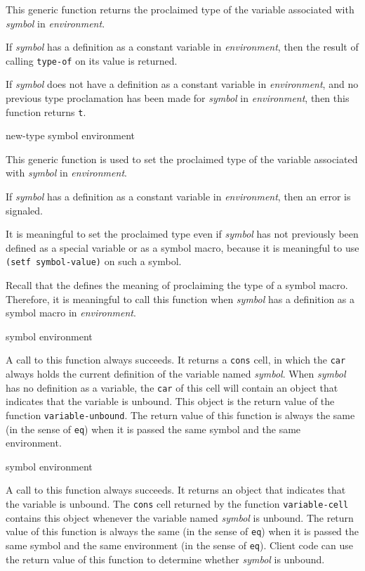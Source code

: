 This generic function returns the proclaimed type of the variable
associated with \textit{symbol} in \textit{environment}.

If \textit{symbol} has a definition as a constant variable in
\textit{environment}, then the result of calling \texttt{type-of} on
its value is returned.

If \textit{symbol} does not have a definition as a constant variable
in \textit{environment}, and no previous type proclamation has been
made for \textit{symbol} in \textit{environment}, then this function
returns \texttt{t}.

 {new-type symbol environment}

This generic function is used to set the proclaimed type of the
variable associated with \textit{symbol} in \textit{environment}.

If \textit{symbol} has a definition as a constant variable in
\textit{environment}, then an error is signaled.

It is meaningful to set the proclaimed type even if \textit{symbol}
has not previously been defined as a special variable or as a symbol
macro, because it is meaningful to use \texttt{(setf symbol-value)} on
such a symbol.

Recall that the \hs{} defines the meaning of proclaiming the type of a
symbol macro.  Therefore, it is meaningful to call this function when
\textit{symbol} has a definition as a symbol macro in
\textit{environment}.

 {symbol environment}

A call to this function always succeeds.  It returns a \texttt{cons}
cell, in which the \texttt{car} always holds the current definition of
the variable named \textit{symbol}.  When \textit{symbol} has no
definition as a variable, the \texttt{car} of this cell will contain
an object that indicates that the variable is unbound.  This object is
the return value of the function \texttt{variable-unbound}.  The
return value of this function is always the same (in the sense of
\texttt{eq}) when it is passed the same symbol and the same
environment.

 {symbol environment}

A call to this function always succeeds.  It returns an object that
indicates that the variable is unbound.  The \texttt{cons} cell
returned by the function \texttt{variable-cell} contains this object
whenever the variable named \textit{symbol} is unbound.  The return
value of this function is always the same (in the sense of
\texttt{eq}) when it is passed the same symbol and the same
environment (in the sense of \texttt{eq}).
Client code can use the return value of this function to
determine whether \textit{symbol} is unbound.

